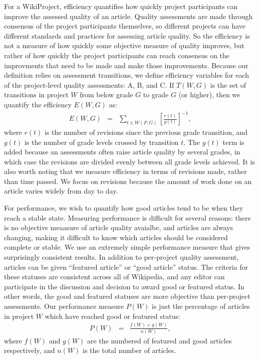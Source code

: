 \documentclass[10pt,twocolumn]{article}
\newcommand{\beq}{\begin{eqnarray}}
\newcommand{\eeq}{\end{eqnarray}}
\newcommand{\+}{\phantom{-}}
\begin{document}
For a WikiProject, efficiency quantifies how quickly project participants can improve the
assessed quality of an article.
Quality assessments are made through consensus of the project participants themselves,
so different projects can have different standards and practices for assessing article quality.
So the efficiency is not a measure of how quickly some objective measure of quality improves,
but rather of how quickly the project participants can reach consensus on the improvments that
need to be made and make those improvements.
Because our definition relies on assessment transitions, we define efficiency variables for
each of the project-level quality assessments: A, B, and C.
If $T(W,G)$ is the set of transitions in project $W$ from below grade $G$ to grade $G$ (or higher),
then we quantify the efficiency $E(W,G)$ as:
\beq
E(W,G) &=& \sum_{t \in W(P,G)} \left[ \frac{r(t)}{g(t)} \right]^{-1},
\eeq
where $r(t)$ is the number of revisions since the previous grade transition,
and $g(t)$ is the number of grade levels crossed by transition $t$.
The $g(t)$ term is added because an assessments often raise article quality by several
grades, in which case the revisions are divided evenly between all grade levels achieved.
It is also worth noting that we measure efficiency in terms of revisions made,
rather than time passed.
We focus on revisions because the amount of work done on an article varies widely from day to day.

For performance, we wish to quantify how good articles tend to be when they reach a stable state.
Measuring performance is difficult for several reasons:
there is no objective meaasure of article quality avaialbe,
and articles are always changing, making it difficult to know which articles should be considered
complete or stable.
We use an extremely simple performance measure that gives surprisingly consistent results.
In addition to per-project quality assessment, articles can be given ``featured article'' or
``good article'' status.
The criteria for these statuses are consistent across all of Wikipedia,
and any editor can participate in the discussion and decision to award good or featured
status.
In other words, the good and featured statuses are more objective than per-project assessments.
Our performance measure $P(W)$ is just the percentage of articles in project $W$ which have reached
good or featured status:
\beq
P(W) &=& \frac{f(W) + g(W)}{n(W)},
\eeq
where $f(W)$ and $g(W)$ are the numbered of featured and good articles respectively,
and $n(W)$ is the total number of articles.
\end{document}
